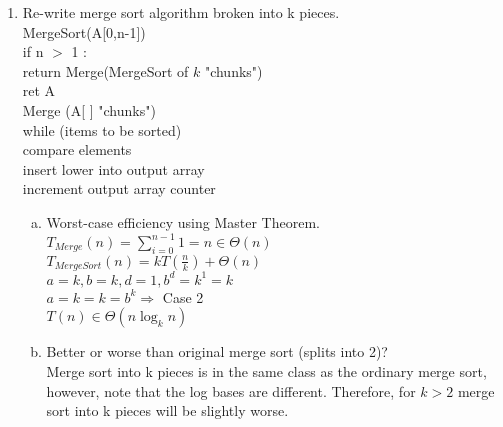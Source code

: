 \documentclass[11pt]{article}
\begin{document}
\begin{enumerate}
	\item
		 Re-write merge sort algorithm broken into k pieces. \\
		 	\hspace*{.4cm}
		 	MergeSort(A[0,n-1]) \\
		 		\hspace*{.8cm}
		 		if n $ > $ 1 : \\
		 			\hspace*{1.2cm}
		 			return Merge(MergeSort of $k$ "chunks") \\
				\hspace*{.8cm}
				ret A\\
			\hspace*{.4cm}
			Merge (A[ ] "chunks") \\
				\hspace*{.8cm}
				while (items to be sorted) \\
					\hspace*{1.2cm}
					compare elements \\
						\hspace*{1.6cm}
						insert lower into output array \\
					\hspace*{1.2cm}
					increment output array counter
		\begin{enumerate}[(a)]
			\item 
				Worst-case efficiency using Master Theorem. \\
					\hspace*{.4cm}
					$ T_{Merge}(n) = \sum_{i=0}^{n-1}1 = n \in \Theta(n) $ \\
					\hspace*{.4cm}
					$ T_{MergeSort}(n) = kT(\frac{n}{k}) + \Theta(n) $ \\
						\hspace*{.8cm}
						$ a=k, b=k, d=1, b^d=k^1=k $ \\
						\hspace*{.8cm}
						$ a=k = k=b^k \Rightarrow $ Case 2 \\
						\hspace*{.8cm}
						$ T(n) \in \Theta(n \log_k n) $ \\
				
			\item
				 Better or worse than original merge sort (splits into 2)? \\
					\hspace*{.4cm}
					Merge sort into k pieces is in the same class as the ordinary merge sort, however, note that the log bases are different. Therefore, for $ k>2 $ merge sort into k pieces will be slightly worse.
				

\end{enumerate}
\end{enumerate}
\end{document}
